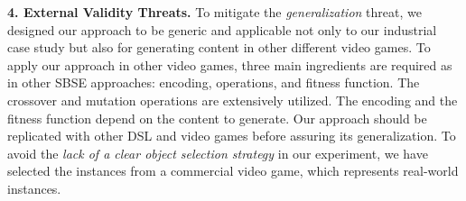 \textbf{4. External Validity Threats.}
To mitigate the \textit{generalization} threat, we designed our approach to be generic and applicable not only to our industrial case study but also for generating content in other different video games. To apply our approach in other video games, three main ingredients are required as in other SBSE approaches: encoding, operations, and fitness function. The crossover and mutation operations are extensively utilized. The encoding and the fitness function depend on the content to generate. Our approach should be replicated with other DSL and video games before assuring its generalization.
To avoid the \textit{lack of a clear object selection strategy} in our experiment, we have selected the instances from a commercial video game, which represents real-world instances.

